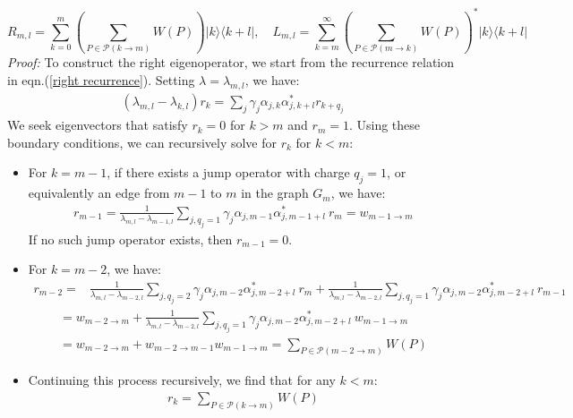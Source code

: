 \documentclass[11pt,a4paper]{article}
\begin{document}
\begin{equation}
    R_{m,l} = \sum_{k=0}^{m} \left( \sum_{P \in \mathcal{P}(k \to m)} W(P) \right) |k\rangle \langle k+l|, \quad L_{m,l} = \sum_{k=m}^{\infty} \left( \sum_{P \in \mathcal{P}(m \to k)} W(P) \right)^* |k\rangle \langle k+l|
\end{equation}
\textit{Proof: } To construct the right eigenoperator, we start from the recurrence relation in eqn.(\ref{right recurrence}). Setting $\lambda = \lambda_{m,l}$, we have:
\begin{align}
    \left( \lambda_{m,l} - \lambda_{k,l} \right) r_k = \sum_{j} \gamma_j \alpha_{j,k } \alpha_{j,k+l}^* r_{k + q_j}
\end{align}
We seek eigenvectors that satisfy $r_k = 0$ for $k > m$ and $r_m = 1$. Using these boundary conditions, we can recursively solve for $r_k$ for $k < m$:
\begin{itemize}
    \item For $k = m-1$, if there exists a jump operator with charge $q_j = 1$, or equivalently an edge from $m-1$ to $m$ in the graph $G_m$, we have:
    \begin{align}
        r_{m-1} = \frac{1}{\lambda_{m,l} - \lambda_{m-1,l}} \sum_{j, q_j=1} \gamma_j \alpha_{j,m-1} \alpha_{j,m-1+l}^* \ r_m = w_{m-1 \rightarrow m}  
    \end{align}
    If no such jump operator exists, then $r_{m-1} = 0$.
    \item For $k = m-2$, we have:
    \begin{align}
        r_{m-2} = & \frac{1}{\lambda_{m,l} - \lambda_{m-2,l}} \sum_{j, q_j = 2} \gamma_j \alpha_{j,m-2} \alpha_{j,m-2+l}^* \ r_m + \frac{1}{\lambda_{m,l} - \lambda_{m-2,l}} \sum_{j, q_j = 1} \gamma_j \alpha_{j,m-2} \alpha_{j,m-2+l}^* \ r_{m-1} 
    \end{align}  
    \begin{gather}
        =   w_{m-2 \rightarrow m} + \frac{1}{\lambda_{m,l} - \lambda_{m-2,l}} \sum_{j, q_j = 1} \gamma_j \alpha_{j,m-2} \alpha_{j,m-2+l}^* \ w_{m-1 \rightarrow m} \\  = w_{m-2 \rightarrow m} + w_{m-2 \rightarrow m-1}  w_{m-1 \rightarrow m} 
        =  \sum_{P \in \mathcal{P}(m-2 \to m)} W(P)
    \end{gather}
    \item Continuing this process recursively, we find that for any $k < m$:
    \begin{align}
        r_k = \sum_{P \in \mathcal{P}(k \to m)} W(P)
    \end{align}
\end{itemize}
\end{document}
